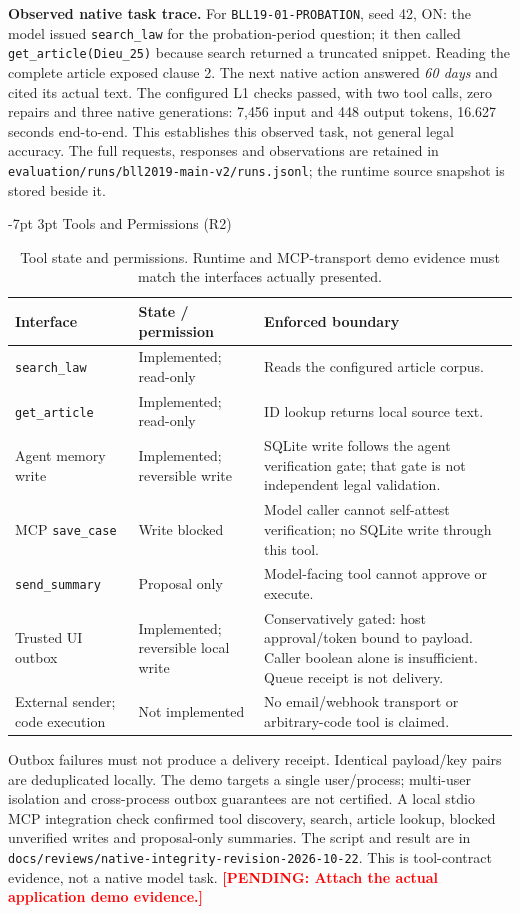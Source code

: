 \documentclass[a4paper,11pt]{article}
\makeatletter
\renewcommand\section{\@startsection{section}{1}{\z@}%
                                   {-7pt \@plus -1pt \@minus -1pt}%
                                   {3pt \@plus 1pt \@minus 1pt}%
                                   {\normalfont\large\bfseries}}
\newcommand{\hdr}[1]{\vspace{2pt}\noindent\textbf{#1}}
\newcommand{\pending}[1]{\textcolor{red}{\textbf{[PENDING: #1]}}}
\newcommand{\code}[1]{\nolinkurl{#1}}
\makeatother
\begin{document}
\hdr{Observed native task trace.}
For \code{BLL19-01-PROBATION}, seed 42, ON: the model issued \code{search_law} for the probation-period question; it then called \code{get_article(Dieu_25)} because search returned a truncated snippet. Reading the complete article exposed clause 2. The next native action answered \emph{60 days} and cited its actual text. The configured L1 checks passed, with two tool calls, zero repairs and three native generations: 7,456 input and 448 output tokens, 16.627 seconds end-to-end. This establishes this observed task, not general legal accuracy. The full requests, responses and observations are retained in \code{evaluation/runs/bll2019-main-v2/runs.jsonl}; the runtime source snapshot is stored beside it.

\section{Tools and Permissions (R2)}
\begin{table}[H]\centering\footnotesize
\begin{tabularx}{\textwidth}{@{}L{2.6cm}L{2.5cm}X@{}}
\toprule Interface & State / permission & Enforced boundary\\\midrule
\code{search_law} & Implemented; read-only & Reads the configured article corpus.\\
\code{get_article} & Implemented; read-only & ID lookup returns local source text.\\
Agent memory write & Implemented; reversible write & SQLite write follows the agent verification gate; that gate is not independent legal validation.\\
MCP \code{save_case} & Write blocked & Model caller cannot self-attest verification; no SQLite write through this tool.\\
\code{send_summary} & Proposal only & Model-facing tool cannot approve or execute.\\
Trusted UI outbox & Implemented; reversible local write & Conservatively gated: host approval/token bound to payload. Caller boolean alone is insufficient. Queue receipt is not delivery.\\
External sender; code execution & Not implemented & No email/webhook transport or arbitrary-code tool is claimed.\\
\bottomrule\end{tabularx}
\caption{Tool state and permissions. Runtime and MCP-transport demo evidence must match the interfaces actually presented.}
\end{table}
Outbox failures must not produce a delivery receipt. Identical payload/key pairs are deduplicated locally. The demo targets a single user/process; multi-user isolation and cross-process outbox guarantees are not certified.
A local stdio MCP integration check confirmed tool discovery, search, article lookup, blocked unverified writes and proposal-only summaries. The script and result are in \code{docs/reviews/native-integrity-revision-2026-10-22}. This is tool-contract evidence, not a native model task. \pending{Attach the actual application demo evidence.}
\end{document}
